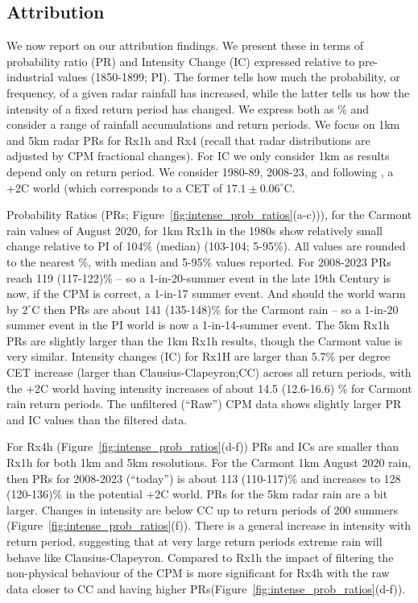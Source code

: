\documentclass[11pt,a4paper]{article}
\begin{document}
\subsection{Attribution}
\label{subsect:attribution}
We now report on our attribution findings. We present these in terms of probability ratio (PR) and  Intensity Change (IC) expressed relative to pre-industrial values (1850-1899; PI). The former tells how much the probability, or frequency, of a given radar rainfall has increased, while the latter tells us how the intensity of a fixed  return period has changed. We express both as \% and consider a range of rainfall accumulations and return periods. We focus on 1km and 5km radar PRs for Rx1h and Rx4 (recall that radar distributions are adjusted by CPM fractional changes).  For IC we only consider 1km as results depend only on return period.  We consider 1980-89, 2008-23, and following \cite{tett2023edinburgh}, a +2C world (which corresponds to a CET of $17.1 \pm 0.06 ^\circ$C.  

Probability Ratios (PRs; Figure~\ref{fig:intense_prob_ratios}(a-c))), for the  Carmont rain values of August 2020, for  1km Rx1h in the 1980s show relatively small change relative to PI of 104\% (median) (103-104; 5-95\%). All values are rounded to the nearest \%, with median and 5-95\% values reported. For 2008-2023 PRs  reach  119 (117-122)\% -- so a 1-in-20-summer event in the late 19th Century is now, if the CPM is correct, a 1-in-17 summer event.  And should the world warm by $2^\circ$C then PRs are about 141 (135-148)\% for the Carmont rain -- so a 1-in-20 summer event in the PI world is now a 1-in-14-summer event. The 5km Rx1h PRs are slightly larger than the 1km Rx1h results, though the Carmont value is very similar. Intensity changes (IC) for Rx1H are larger than 5.7\% per degree CET increase (larger than Clausius-Clapeyron;CC) across all return periods, with the +2C world having intensity increases of about 14.5 (12.6-16.6) \% for Carmont rain return periods. The unfiltered (``Raw'') CPM data  shows slightly larger PR and IC values than the filtered data.

For Rx4h  (Figure~\ref{fig:intense_prob_ratios}(d-f)) PRs and ICs are smaller than  Rx1h for both 1km and 5km resolutions. For the Carmont 1km  August 2020 rain, then PRs for 2008-2023 (``today'') is about  113 (110-117)\% and increases to 128 (120-136)\% in the potential +2C world. PRs for the 5km radar rain are a bit larger.  Changes in intensity are below CC up to return periods of 200 summers  (Figure~\ref{fig:intense_prob_ratios}(f)).  There is a general increase in intensity with return period, suggesting that at very large return periods extreme rain will behave like   Clausius-Clapeyron. Compared to Rx1h the impact of filtering the non-physical behaviour of the CPM is more significant for Rx4h  with the raw data closer to  CC and having higher PRs(Figure~\ref{fig:intense_prob_ratios}(d-f)). 
\end{document}
